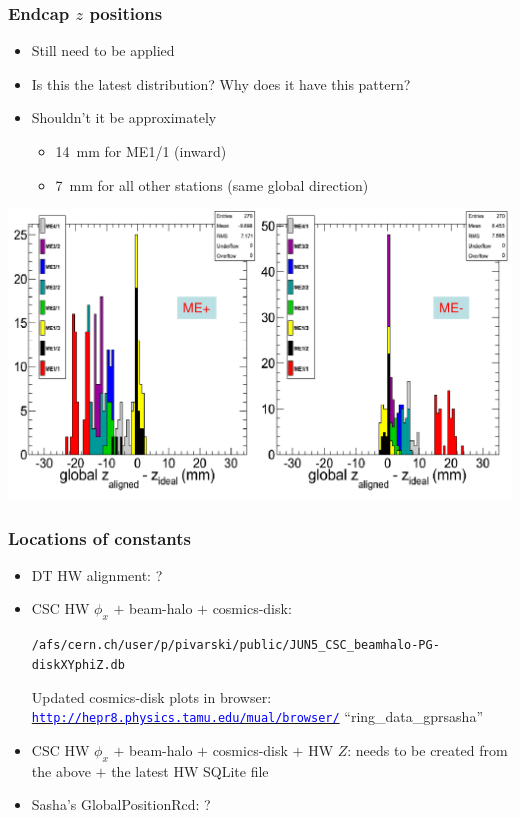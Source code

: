 \documentclass[compress]{beamer}
\begin{document}
\begin{frame}
\frametitle{Endcap $z$ positions}
\begin{itemize}
\item Still need to be applied
\item Is this the latest distribution?  Why does it have this pattern?
\item Shouldn't it be approximately
\begin{itemize}
\item 14~mm for ME1/1 (inward)
\item 7~mm for all other stations (same global direction)
\end{itemize}
\end{itemize}

\begin{center}
\includegraphics[width=0.9\linewidth]{endcap_z-split_1.png}
\end{center}
\end{frame}

\begin{frame}
\frametitle{Locations of constants}
\begin{itemize}
\item DT HW alignment: ?
\item CSC HW $\phi_x$ $+$ beam-halo $+$ cosmics-disk:

{\tt \scriptsize /afs/cern.ch/user/p/pivarski/public/JUN5\_CSC\_beamhalo-PG-diskXYphiZ.db}

Updated cosmics-disk plots in browser: \href{http://hepr8.physics.tamu.edu/mual/browser/}{\tt \scriptsize \textcolor{blue}{http://hepr8.physics.tamu.edu/mual/browser/}} ``ring\_data\_gprsasha''


\item CSC HW $\phi_x$ $+$ beam-halo $+$ cosmics-disk $+$ HW $Z$: needs to be created from the above $+$ the latest HW SQLite file

\item Sasha's GlobalPositionRcd: ?
\end{itemize}
\label{numpages}
\end{frame}
\end{document}
